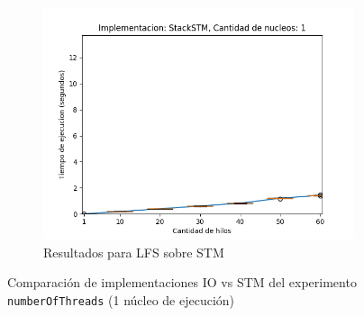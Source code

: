 \begin{appendices}
\begin{figure}[t]
\begin{subfigure}[b]{0.49\textwidth}
        \includegraphics[width=\textwidth]{images/numberOfThreads/plots/expStackSTM-1}
        \caption{Resultados para LFS sobre STM}
        \label{subfig:numberOfThreads-stackstm-1}
    \end{subfigure}
    \caption{Comparación de implementaciones IO vs STM del experimento \texttt{numberOfThreads} (1 núcleo de ejecución)}
    \label{fig:numberOfThreads-boxplots-1}
\end{figure}


\end{appendices}
